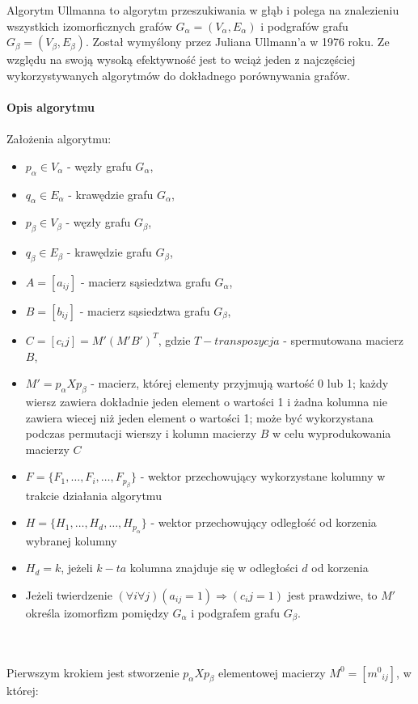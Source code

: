 \documentclass[a4paper,12pt,twoside]{article}
\begin{document}
Algorytm Ullmanna to algorytm przeszukiwania w głąb i polega na znalezieniu wszystkich izomorficznych grafów $G_\alpha = (V_\alpha, E_\alpha)$ i podgrafów grafu $G_\beta = (V_\beta, E_\beta)$. Został wymyślony przez Juliana Ullmann'a w 1976 roku\cite{ullmann1}. Ze względu na swoją wysoką efektywność jest to wciąż jeden z najczęściej wykorzystywanych algorytmów do dokładnego porównywania grafów.
\\ \\
\textbf{Opis algorytmu}
\\ \\
Założenia algorytmu\cite{ullmann}:
\begin{itemize}
\item $p_\alpha \in V_\alpha$ - węzły grafu $G_\alpha$,
\item $q_\alpha \in E_\alpha$ - krawędzie grafu $G_\alpha$,
\item $p_\beta \in V_\beta$ - węzły grafu $G_\beta$,
\item $q_\beta \in E_\beta$ - krawędzie grafu $G_\beta$,
\item $A = [a_{ij}]$ - macierz sąsiedztwa grafu $G_\alpha$,
\item $B = [b_{ij}]$ - macierz sąsiedztwa grafu $G_\beta$,
\item $C = [c_ij] = M'(M'B')^T$, gdzie $T - transpozycja$ - spermutowana macierz $B$,
\item $M' = p_\alpha X p_\beta$ - macierz, której elementy przyjmują wartość 0 lub 1; każdy wiersz zawiera dokładnie jeden element o wartości 1 i żadna kolumna nie zawiera wiecej niż jeden element o wartości 1; może być wykorzystana podczas permutacji wierszy i kolumn macierzy $B$ w celu wyprodukowania macierzy $C$
\item $F = \{ F_1, \ldots, F_i, \ldots, F_{p_\beta} \}$ - wektor przechowujący wykorzystane kolumny w trakcie działania algorytmu
\item $H = \{ H_1, \ldots, H_d, \ldots, H_{p_\alpha} \}$ - wektor przechowujący odległość od korzenia wybranej kolumny
\item $H_d = k$, jeżeli $k-ta$ kolumna znajduje się w odległości $d$ od korzenia
\item Jeżeli twierdzenie $(\forall{i} \forall{j}) (a_{ij} = 1) \Rightarrow (c_ij = 1)$ jest prawdziwe, to $M'$ określa izomorfizm pomiędzy $G_\alpha$ i podgrafem grafu $G_\beta$.
\end{itemize}
\\ \\
Pierwszym krokiem jest stworzenie $p_\alpha X p_\beta$ elementowej macierzy $M^0 = [{m^0}_{ij}]$, w której:
\end{document}
